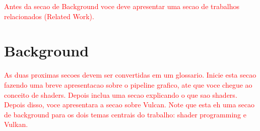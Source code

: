 \textcolor{red}{Antes da secao de Background voce deve apresentar uma secao de trabalhos relacionados (Related Work).}

\chapter{Background}

\textcolor{red}{As duas proximas secoes devem ser convertidas em um glossario. Inicie esta secao fazendo uma breve apresentacao sobre o pipeline grafico, ate que voce chegue ao conceito de shaders. Depois inclua uma secao explicando o que sao shaders. Depois disso, voce apresentara a secao sobre Vulcan. Note que esta eh uma secao de background para os dois temas centrais do trabalho: shader programming e Vulkan.} 






